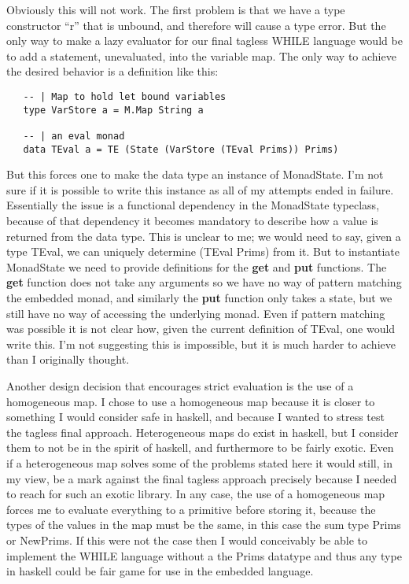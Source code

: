 \documentclass[9pt,letterpaper]{extarticle}
\begin{document}
  Obviously this will not work. The first problem is that we have a type
  constructor ``r'' that is unbound, and therefore will cause a type error. But
  the only way to make a lazy evaluator for our final tagless WHILE language
  would be to add a statement, unevaluated, into the variable map. The only way
  to achieve the desired behavior is a definition like this:
  \begin{verbatim}
   -- | Map to hold let bound variables
   type VarStore a = M.Map String a
   
   -- | an eval monad
   data TEval a = TE (State (VarStore (TEval Prims)) Prims) 
  \end{verbatim}

  But this forces one to make the data type an instance of MonadState. I'm not
  sure if it is possible to write this instance as all of my attempts ended in
  failure. Essentially the issue is a functional dependency in the MonadState
  typeclass, because of that dependency it becomes mandatory to describe how a
  value is returned from the data type. This is unclear to me; we would need to
  say, given a type TEval, we can uniquely determine (TEval Prims) from it. But
  to instantiate MonadState we need to provide definitions for the \textbf{get}
  and \textbf{put} functions. The \textbf{get} function does not take any
  arguments so we have no way of pattern matching the embedded monad, and
  similarly the \textbf{put} function only takes a state, but we still have no
  way of accessing the underlying monad. Even if pattern matching was possible
  it is not clear how, given the current definition of TEval, one would write
  this. I'm not suggesting this is impossible, but it is much harder to achieve
  than I originally thought. 

  Another design decision that encourages strict evaluation is the use of a
  homogeneous map. I chose to use a homogeneous map because it is closer to
  something I would consider safe in haskell, and because I wanted to stress
  test the tagless final approach. Heterogeneous maps do exist in haskell, but I
  consider them to not be in the spirit of haskell, and furthermore to be fairly
  exotic. Even if a heterogeneous map solves some of the problems stated here it
  would still, in my view, be a mark against the final tagless approach
  precisely because I needed to reach for such an exotic library. In any case,
  the use of a homogeneous map forces me to evaluate everything to a primitive
  before storing it, because the types of the values in the map must be the
  same, in this case the sum type Prims or NewPrims. If this were not the case
  then I would conceivably be able to implement the WHILE language without a the
  Prims datatype and thus any type in haskell could be fair game for use in the
  embedded language.
\end{document}
